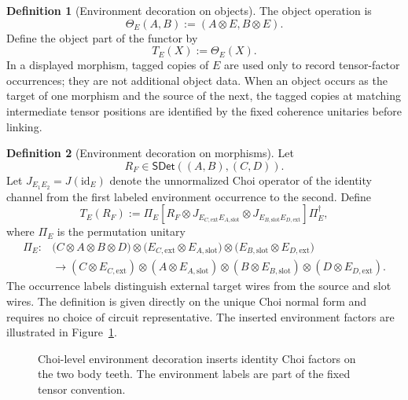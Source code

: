 \documentclass[11pt,a4paper]{article}
\theoremstyle{definition}
\newtheorem{definition}{Definition}[section]
\theoremstyle{plain}
\theoremstyle{remark}
\newcommand{\id}{\mathrm{id}}
\newcommand{\SDet}{\mathsf{SDet}}
\begin{document}
\begin{definition}[Environment decoration on objects]
The object operation is
\[
\Theta_E(A,B):=(A\otimes E,B\otimes E).
\]
Define the object part of the functor by
\[
T_E(X):=\Theta_E(X).
\]
In a displayed morphism, tagged copies of $E$ are used only to record
tensor-factor occurrences; they are not additional object data. When an
object occurs as the target of one morphism and the source of the next,
the tagged copies at matching intermediate tensor positions are identified
by the fixed coherence unitaries before linking.
\end{definition}

\begin{definition}[Environment decoration on morphisms]
Let
\[
R_F\in\SDet((A,B),(C,D)).
\]
Let $J_{E_1E_2}=J(\id_E)$ denote the unnormalized Choi operator of the
identity channel from the first labeled environment occurrence to the
second. Define
\[
T_E(R_F):=\Pi_E\left[
R_F\otimes
J_{E_{C,\mathrm{ext}}E_{A,\mathrm{slot}}}
\otimes
J_{E_{B,\mathrm{slot}}E_{D,\mathrm{ext}}}
\right]\Pi_E^\dagger,
\]
where $\Pi_E$ is the permutation unitary
\[
\begin{aligned}
\Pi_E:
&\bigl(C\otimes A\otimes B\otimes D\bigr)
\otimes\bigl(E_{C,\mathrm{ext}}\otimes E_{A,\mathrm{slot}}\bigr)
\otimes\bigl(E_{B,\mathrm{slot}}\otimes E_{D,\mathrm{ext}}\bigr)\\
&\longrightarrow
(C\otimes E_{C,\mathrm{ext}})\otimes
(A\otimes E_{A,\mathrm{slot}})\otimes
(B\otimes E_{B,\mathrm{slot}})\otimes
(D\otimes E_{D,\mathrm{ext}}).
\end{aligned}
\]
The occurrence labels distinguish external target wires from the source
and slot wires. The definition is given directly on the unique Choi normal
form and requires no choice of circuit representative. The inserted
environment factors are illustrated in Figure~\ref{fig:SDet-TE}.
\end{definition}

\begin{figure}[ht]
\centering
{}
\caption{Choi-level environment decoration inserts identity Choi factors on the two body teeth. The environment labels are part of the fixed tensor convention.}
\label{fig:SDet-TE}
\end{figure}
\end{document}
